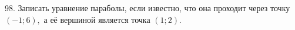 98. Записать уравнение параболы, если известно, что она проходит через точку $(-1;6),$ а её вершиной является точка $(1;2).$\\
